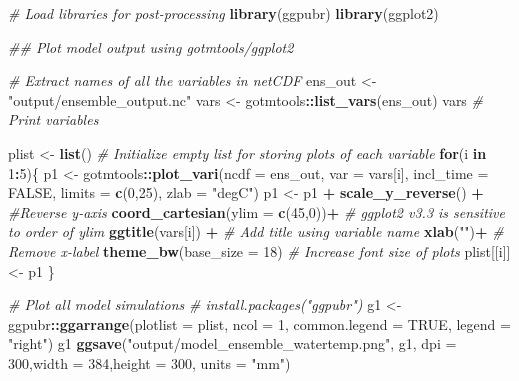 \documentclass[
]{article}
\newenvironment{Shaded}{\begin{snugshade}}{\end{snugshade}}
\newcommand{\CommentTok}[1]{\textcolor[rgb]{0.56,0.35,0.01}{\textit{#1}}}
\newcommand{\ControlFlowTok}[1]{\textcolor[rgb]{0.13,0.29,0.53}{\textbf{#1}}}
\newcommand{\DataTypeTok}[1]{\textcolor[rgb]{0.13,0.29,0.53}{#1}}
\newcommand{\DecValTok}[1]{\textcolor[rgb]{0.00,0.00,0.81}{#1}}
\newcommand{\KeywordTok}[1]{\textcolor[rgb]{0.13,0.29,0.53}{\textbf{#1}}}
\newcommand{\NormalTok}[1]{#1}
\newcommand{\OperatorTok}[1]{\textcolor[rgb]{0.81,0.36,0.00}{\textbf{#1}}}
\newcommand{\OtherTok}[1]{\textcolor[rgb]{0.56,0.35,0.01}{#1}}
\newcommand{\StringTok}[1]{\textcolor[rgb]{0.31,0.60,0.02}{#1}}
\begin{document}
\begin{Shaded}
\begin{Highlighting}[]
\CommentTok{# Load libraries for post-processing}
\KeywordTok{library}\NormalTok{(ggpubr)}
\KeywordTok{library}\NormalTok{(ggplot2)}

\CommentTok{## Plot model output using gotmtools/ggplot2}

\CommentTok{# Extract names of all the variables in netCDF}
\NormalTok{ens_out <-}\StringTok{ "output/ensemble_output.nc"}
\NormalTok{vars <-}\StringTok{ }\NormalTok{gotmtools}\OperatorTok{::}\KeywordTok{list_vars}\NormalTok{(ens_out)}
\NormalTok{vars }\CommentTok{# Print variables}

\NormalTok{plist <-}\StringTok{ }\KeywordTok{list}\NormalTok{() }\CommentTok{# Initialize empty list for storing plots of each variable}
\ControlFlowTok{for}\NormalTok{(i }\ControlFlowTok{in} \DecValTok{1}\OperatorTok{:}\DecValTok{5}\NormalTok{)\{}
\NormalTok{  p1 <-}\StringTok{ }\NormalTok{gotmtools}\OperatorTok{::}\KeywordTok{plot_vari}\NormalTok{(}\DataTypeTok{ncdf =}\NormalTok{ ens_out,}
                             \DataTypeTok{var =}\NormalTok{ vars[i],}
                             \DataTypeTok{incl_time =} \OtherTok{FALSE}\NormalTok{,}
                             \DataTypeTok{limits =} \KeywordTok{c}\NormalTok{(}\DecValTok{0}\NormalTok{,}\DecValTok{25}\NormalTok{),}
                             \DataTypeTok{zlab =} \StringTok{"degC"}\NormalTok{)}
\NormalTok{  p1 <-}\StringTok{ }\NormalTok{p1 }\OperatorTok{+}\StringTok{ }\KeywordTok{scale_y_reverse}\NormalTok{() }\OperatorTok{+}\StringTok{ }\CommentTok{#Reverse y-axis}
\StringTok{    }\KeywordTok{coord_cartesian}\NormalTok{(}\DataTypeTok{ylim =} \KeywordTok{c}\NormalTok{(}\DecValTok{45}\NormalTok{,}\DecValTok{0}\NormalTok{))}\OperatorTok{+}\StringTok{ }\CommentTok{# ggplot2 v3.3 is sensitive to order of ylim}
\StringTok{    }\KeywordTok{ggtitle}\NormalTok{(vars[i]) }\OperatorTok{+}\StringTok{ }\CommentTok{# Add title using variable name}
\StringTok{    }\KeywordTok{xlab}\NormalTok{(}\StringTok{""}\NormalTok{)}\OperatorTok{+}\StringTok{ }\CommentTok{# Remove x-label}
\StringTok{    }\KeywordTok{theme_bw}\NormalTok{(}\DataTypeTok{base_size =} \DecValTok{18}\NormalTok{) }\CommentTok{# Increase font size of plots}
\NormalTok{  plist[[i]] <-}\StringTok{ }\NormalTok{p1}
\NormalTok{\}}

\CommentTok{# Plot all model simulations}
\CommentTok{# install.packages("ggpubr")}
\NormalTok{g1 <-}\StringTok{ }\NormalTok{ggpubr}\OperatorTok{::}\KeywordTok{ggarrange}\NormalTok{(}\DataTypeTok{plotlist =}\NormalTok{ plist, }\DataTypeTok{ncol =} \DecValTok{1}\NormalTok{, }\DataTypeTok{common.legend =} \OtherTok{TRUE}\NormalTok{, }\DataTypeTok{legend =} \StringTok{"right"}\NormalTok{)}
\NormalTok{g1}
\KeywordTok{ggsave}\NormalTok{(}\StringTok{"output/model_ensemble_watertemp.png"}\NormalTok{, g1,  }\DataTypeTok{dpi =} \DecValTok{300}\NormalTok{,}\DataTypeTok{width =} \DecValTok{384}\NormalTok{,}\DataTypeTok{height =} \DecValTok{300}\NormalTok{, }\DataTypeTok{units =} \StringTok{"mm"}\NormalTok{)}
\end{Highlighting}
\end{Shaded}
\end{document}
